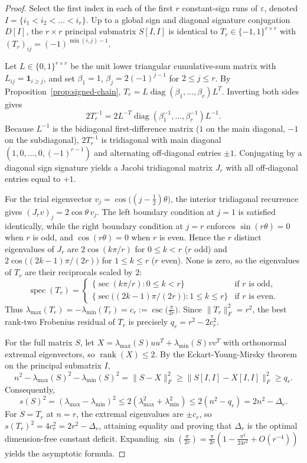 \documentclass[11pt,reqno]{article}
\theoremstyle{definition}
\newcommand{\diag}{\operatorname{diag}}
\newcommand{\rank}{\operatorname{rank}}
\begin{document}
\begin{proof}
Select the first index in each of the first $r$ constant-sign runs of $\varepsilon$, denoted $I = \{i_1 < i_2 < \dots < i_r\}$. Up to a global sign and diagonal signature conjugation $D[I]$, the $r \times r$ principal submatrix $S[I, I]$ is identical to $T_r \in \{-1, 1\}^{r \times r}$ with $(T_r)_{ij} = (-1)^{\min(i, j) - 1}$.

Let $L \in \{0, 1\}^{r \times r}$ be the unit lower triangular cumulative-sum matrix with $L_{ij} = \mathbf{1}_{i \ge j}$, and set $\beta_1 = 1$, $\beta_j = 2(-1)^{j-1}$ for $2 \le j \le r$. By Proposition~\ref{prop:signed-chain}, $T_r = L \diag(\beta_1, \dots, \beta_r) L^T$. Inverting both sides gives
\[
2 T_r^{-1} = 2 L^{-T} \diag(\beta_1^{-1}, \dots, \beta_r^{-1}) L^{-1}.
\]
Because $L^{-1}$ is the bidiagonal first-difference matrix ($1$ on the main diagonal, $-1$ on the subdiagonal), $2 T_r^{-1}$ is tridiagonal with main diagonal $(1, 0, \dots, 0, (-1)^{r-1})$ and alternating off-diagonal entries $\pm 1$. Conjugating by a diagonal sign signature yields a Jacobi tridiagonal matrix $J_r$ with all off-diagonal entries equal to $+1$.

For the trial eigenvector $v_j = \cos\bigl((j - \frac{1}{2})\theta\bigr)$, the interior tridiagonal recurrence gives $(J_r v)_j = 2\cos\theta\, v_j$. The left boundary condition at $j=1$ is satisfied identically, while the right boundary condition at $j=r$ enforces $\sin(r\theta) = 0$ when $r$ is odd, and $\cos(r\theta) = 0$ when $r$ is even. Hence the $r$ distinct eigenvalues of $J_r$ are $2\cos(k\pi / r)$ for $0 \le k < r$ ($r$ odd) and $2\cos\bigl((2k-1)\pi / (2r)\bigr)$ for $1 \le k \le r$ ($r$ even). None is zero, so the eigenvalues of $T_r$ are their reciprocals scaled by $2$:
\[
\operatorname{spec}(T_r) =
\begin{cases}
\{\sec(k\pi / r) : 0 \le k < r\} & \text{if } r \text{ is odd}, \\
\{\sec\bigl((2k-1)\pi / (2r)\bigr) : 1 \le k \le r\} & \text{if } r \text{ is even}.
\end{cases}
\]
Thus $\lambda_{\max}(T_r) = -\lambda_{\min}(T_r) = c_r := \csc\bigl(\frac{\pi}{2r}\bigr)$. Since $\|T_r\|_F^2 = r^2$, the best rank-two Frobenius residual of $T_r$ is precisely $q_r = r^2 - 2c_r^2$.

For the full matrix $S$, let $X = \lambda_{\max}(S) u u^T + \lambda_{\min}(S) v v^T$ with orthonormal extremal eigenvectors, so $\rank(X) \le 2$. By the Eckart-Young-Mirsky theorem on the principal submatrix $I$,
\[
n^2 - \lambda_{\max}(S)^2 - \lambda_{\min}(S)^2 = \|S - X\|_F^2 \ge \|S[I, I] - X[I, I]\|_F^2 \ge q_r.
\]
Consequently,
\[
s(S)^2 = (\lambda_{\max} - \lambda_{\min})^2 \le 2(\lambda_{\max}^2 + \lambda_{\min}^2) \le 2(n^2 - q_r) = 2n^2 - \Delta_r.
\]
For $S = T_r$ at $n = r$, the extremal eigenvalues are $\pm c_r$, so $s(T_r)^2 = 4c_r^2 = 2r^2 - \Delta_r$, attaining equality and proving that $\Delta_r$ is the optimal dimension-free constant deficit. Expanding $\sin(\frac{\pi}{2r}) = \frac{\pi}{2r}(1 - \frac{\pi^2}{24 r^2} + O(r^{-4}))$ yields the asymptotic formula.
\end{proof}
\end{document}
